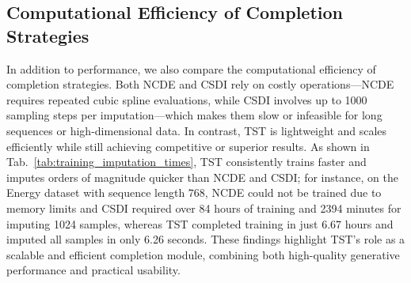 \documentclass{article}
\theoremstyle{plain}
\theoremstyle{definition}
\theoremstyle{remark}
\begin{document}
\subsection{Computational Efficiency of Completion Strategies}
\label{sec:efficiency_completion_strategy}
In addition to performance, we also compare the computational efficiency of completion strategies. Both NCDE and CSDI rely on costly operations—NCDE requires repeated cubic spline evaluations, while CSDI involves up to 1000 sampling steps per imputation—which makes them slow or infeasible for long sequences or high-dimensional data. In contrast, TST is lightweight and scales efficiently while still achieving competitive or superior results. As shown in Tab.~\ref{tab:training_imputation_times}, TST consistently trains faster and imputes orders of magnitude quicker than NCDE and CSDI; for instance, on the Energy dataset with sequence length $768$, NCDE could not be trained due to memory limits and CSDI required over 84 hours of training and 2394 minutes for imputing 1024 samples, whereas TST completed training in just 6.67 hours and imputed all samples in only 6.26 seconds. These findings highlight TST’s role as a scalable and efficient completion module, combining both high-quality generative performance and practical usability.
\end{document}
